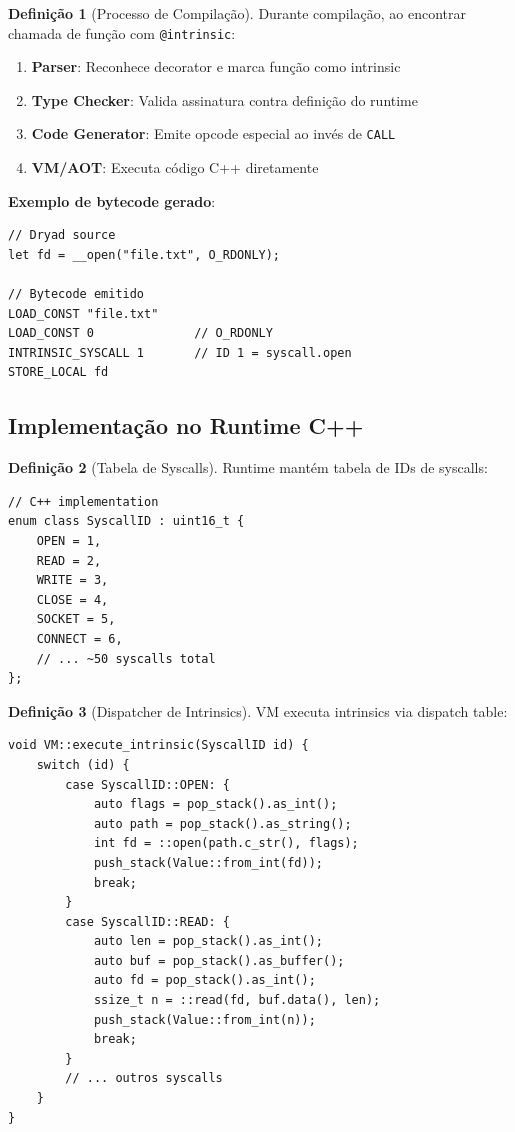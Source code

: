 \documentclass[12pt,a4paper]{article}
\theoremstyle{definition}
\newtheorem{definition}{Definição}[section]
\begin{document}
\begin{definition}[Processo de Compilação]
Durante compilação, ao encontrar chamada de função com \texttt{@intrinsic}:

\begin{enumerate}
    \item \textbf{Parser}: Reconhece decorator e marca função como intrinsic
    \item \textbf{Type Checker}: Valida assinatura contra definição do runtime
    \item \textbf{Code Generator}: Emite opcode especial ao invés de \texttt{CALL}
    \item \textbf{VM/AOT}: Executa código C++ diretamente
\end{enumerate}

\textbf{Exemplo de bytecode gerado}:
\begin{verbatim}
// Dryad source
let fd = __open("file.txt", O_RDONLY);

// Bytecode emitido
LOAD_CONST "file.txt"
LOAD_CONST 0              // O_RDONLY
INTRINSIC_SYSCALL 1       // ID 1 = syscall.open
STORE_LOCAL fd
\end{verbatim}
\end{definition}

\subsection{Implementação no Runtime C++}

\begin{definition}[Tabela de Syscalls]
Runtime mantém tabela de IDs de syscalls:

\begin{verbatim}
// C++ implementation
enum class SyscallID : uint16_t {
    OPEN = 1,
    READ = 2,
    WRITE = 3,
    CLOSE = 4,
    SOCKET = 5,
    CONNECT = 6,
    // ... ~50 syscalls total
};
\end{verbatim}
\end{definition}

\begin{definition}[Dispatcher de Intrinsics]
VM executa intrinsics via dispatch table:

\begin{verbatim}
void VM::execute_intrinsic(SyscallID id) {
    switch (id) {
        case SyscallID::OPEN: {
            auto flags = pop_stack().as_int();
            auto path = pop_stack().as_string();
            int fd = ::open(path.c_str(), flags);
            push_stack(Value::from_int(fd));
            break;
        }
        case SyscallID::READ: {
            auto len = pop_stack().as_int();
            auto buf = pop_stack().as_buffer();
            auto fd = pop_stack().as_int();
            ssize_t n = ::read(fd, buf.data(), len);
            push_stack(Value::from_int(n));
            break;
        }
        // ... outros syscalls
    }
}
\end{verbatim}
\end{definition}
\end{document}

